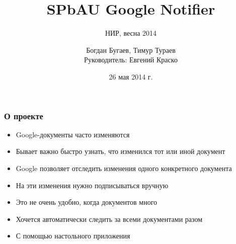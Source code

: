 \documentclass[10pt,pdf,hyperref={unicode}]{beamer}
\begin{document}
    \title[GoogleNotifier]{SPbAU Google Notifier}
    \subtitle{НИР, весна 2014}
    \author{Богдан Бугаев, Тимур Тураев \\ Руководитель: Евгений Краско}
    \date{26 мая 2014 г.}
    

    \begin{frame}
		\titlepage
	\end{frame}
    
    \begin{frame}\frametitle{О проекте}
        \begin{itemize}
        	\item	Google-документы часто изменяются
	       	\item	Бывает важно быстро узнать, что изменился тот или иной документ
	       	\pause
            \item	Google позволяет отследить изменения одного конкретного документа
            \pause
            \item	На эти изменения нужно подписываться вручную
            \pause            
            \item	Это не очень удобно, когда документов много
            \pause            
            \item	Хочется автоматически следить за всеми документами разом
            \pause            
            \item	С помощью настольного приложения
        \end{itemize}
    \end{frame}    
    
\end{document}
